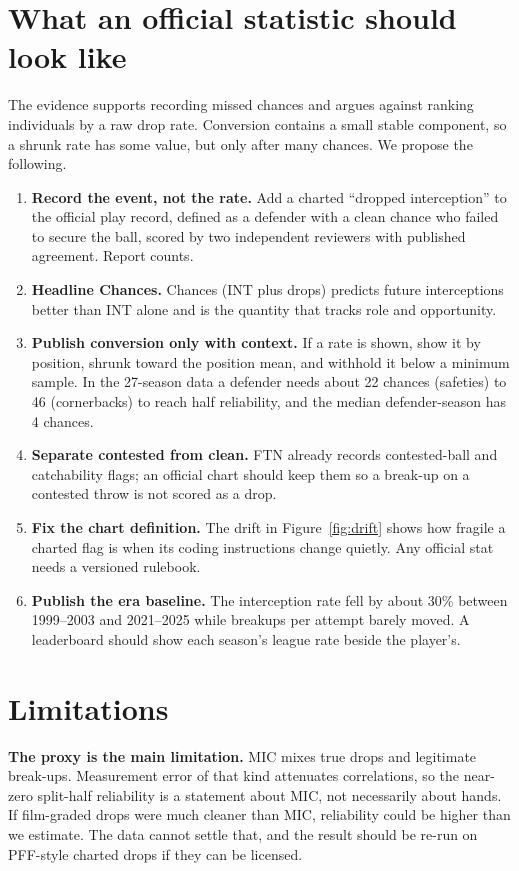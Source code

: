 \documentclass[11pt]{article}
\begin{document}
\section{What an official statistic should look like}
The evidence supports recording missed chances and argues against ranking individuals by a raw drop rate. Conversion contains a small stable component, so a shrunk rate has some value, but only after many chances. We propose the following.
\begin{enumerate}[nosep]
\item \textbf{Record the event, not the rate.} Add a charted ``dropped interception'' to the official play record, defined as a defender with a clean chance who failed to secure the ball, scored by two independent reviewers with published agreement. Report counts.
\item \textbf{Headline Chances.} Chances (INT plus drops) predicts future interceptions better than INT alone and is the quantity that tracks role and opportunity.
\item \textbf{Publish conversion only with context.} If a rate is shown, show it by position, shrunk toward the position mean, and withhold it below a minimum sample. In the 27-season data a defender needs about 22 chances (safeties) to 46 (cornerbacks) to reach half reliability, and the median defender-season has 4 chances.
\item \textbf{Separate contested from clean.} FTN already records contested-ball and catchability flags; an official chart should keep them so a break-up on a contested throw is not scored as a drop.
\item \textbf{Fix the chart definition.} The drift in Figure~\ref{fig:drift} shows how fragile a charted flag is when its coding instructions change quietly. Any official stat needs a versioned rulebook.
\item \textbf{Publish the era baseline.} The interception rate fell by about 30\% between 1999--2003 and 2021--2025 while breakups per attempt barely moved. A leaderboard should show each season's league rate beside the player's.
\end{enumerate}

\section{Limitations}
\textbf{The proxy is the main limitation.} MIC mixes true drops and legitimate break-ups. Measurement error of that kind attenuates correlations, so the near-zero split-half reliability is a statement about MIC, not necessarily about hands. If film-graded drops were much cleaner than MIC, reliability could be higher than we estimate. The data cannot settle that, and the result should be re-run on PFF-style charted drops if they can be licensed.
\end{document}

